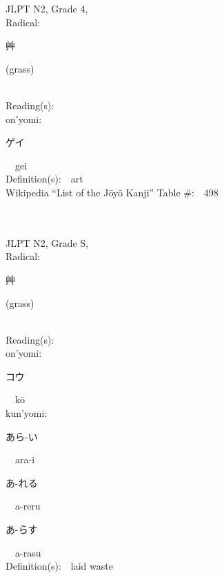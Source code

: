 \begin{multicols}{2}
{JLPT N2, Grade 4, \\Radical:\ \ {\begin{CJK}{UTF8}{min} 艸 \end{CJK}} (grass) } \\
Reading(s):\ \ \\
{\hspace*{1em}}on'yomi:\ \ \\
{\hspace*{2em}}{\begin{CJK}{UTF8}{min} ゲイ \end{CJK}}\ \ gei\ \ \\
Definition(s):\ \ art \\
Wikipedia ``List of the J\=oy\=o Kanji'' Table \#:\ \ 498 \\
\ \ \\
{\fontsize{34pt}{40pt}  }\ \ \\  %
{JLPT N2, Grade S, \\Radical:\ \ {\begin{CJK}{UTF8}{min} 艸 \end{CJK}} (grass) } \\
Reading(s):\ \ \\
{\hspace*{1em}}on'yomi:\ \ \\
{\hspace*{2em}}{\begin{CJK}{UTF8}{min} コウ \end{CJK}}\ \ k\=o\ \ \\
{\hspace*{1em}}kun'yomi:\ \ \\
{\hspace*{2em}}{\begin{CJK}{UTF8}{min} あら-い \end{CJK}}\ \ ara-i\ \ \\
{\hspace*{2em}}{\begin{CJK}{UTF8}{min} あ-れる \end{CJK}}\ \ a-reru\ \ \\
{\hspace*{2em}}{\begin{CJK}{UTF8}{min} あ-らす \end{CJK}}\ \ a-rasu\ \ \\
Definition(s):\ \ laid waste \\

\end{multicols}
